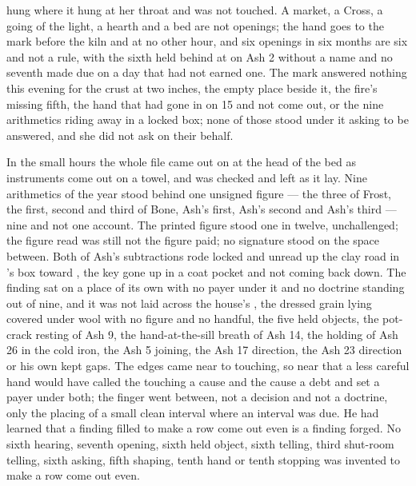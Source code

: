  hung where it hung at her throat and was not touched. A market, a Cross, a going of the light, a hearth and a bed are not openings; the hand goes to the mark before the kiln and at no other hour, and six openings in six months are six and not a rule, with the sixth held behind at  on Ash 2 without a name and no seventh made due on a day that had not earned one. The mark answered nothing this evening for the crust at two inches, the empty place beside it, the fire's missing fifth, the hand that had gone in on  15 and not come out, or the nine arithmetics riding away in a locked box; none of those stood under it asking to be answered, and she did not ask on their behalf.

\scenebreak

In the small hours the whole file came out on  at the head of the bed as instruments come out on a towel, and was checked and left as it lay. Nine arithmetics of the year stood behind one unsigned figure --- the three of Frost, the first, second and third of Bone, Ash's first, Ash's second and Ash's third --- nine and not one account. The printed figure stood one in twelve, unchallenged; the figure read was still not the figure paid; no signature stood on the space between. Both of Ash's subtractions rode locked and unread up the clay road in 's box toward , the key gone up in a coat pocket and not coming back down. The finding sat on a place of its own with no payer under it and no doctrine standing out of nine, and it was not laid across the house's , the dressed grain lying covered under wool with no figure and no handful, the five held objects, the pot-crack resting of Ash 9, the hand-at-the-sill breath of Ash 14, the holding of Ash 26 in the cold iron, the Ash 5 joining, the Ash 17 direction, the Ash 23 direction or his own kept gaps. The edges came near to touching, so near that a less careful hand would have called the touching a cause and the cause a debt and set a payer under both; the finger went between, not a decision and not a doctrine, only the placing of a small clean interval where an interval was due. He had learned that a finding filled to make a row come out even is a finding forged. No sixth hearing, seventh opening, sixth held object, sixth telling, third shut-room telling, sixth asking, fifth shaping, tenth hand or tenth stopping was invented to make a row come out even.

